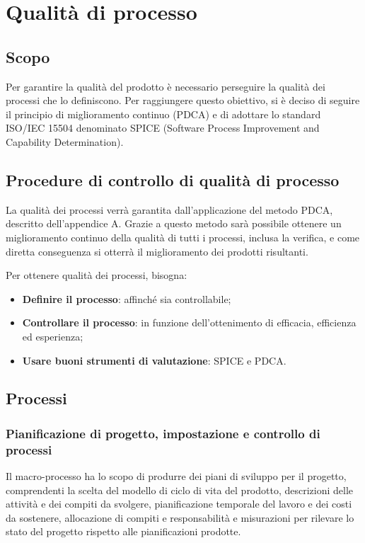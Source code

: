 \documentclass[PianoDiQualifica.tex]{subfiles}
\begin{document}
\chapter{Qualità di processo}

\section{Scopo} 
Per garantire la qualità del prodotto è necessario perseguire la qualità dei processi che lo definiscono.
Per raggiungere questo obiettivo, si è deciso di seguire il principio di miglioramento continuo (PDCA) e di adottare lo standard ISO/IEC 15504 denominato SPICE (Software Process Improvement and Capability Determination).

\section{Procedure di controllo di qualità di processo}
La qualità dei processi verrà garantita dall'applicazione del metodo PDCA, descritto dell'appendice A. Grazie a questo metodo sarà possibile ottenere un miglioramento continuo della qualità di tutti i processi, inclusa la verifica, e come diretta conseguenza si otterrà il miglioramento dei prodotti risultanti. 

Per ottenere qualità dei processi, bisogna:
\begin{itemize}
	\item \textbf{Definire il processo}: affinché sia controllabile;
	\item \textbf{Controllare il processo}: in funzione dell'ottenimento di efficacia, efficienza ed esperienza;
	\item \textbf{Usare buoni strumenti di valutazione}: SPICE e PDCA.
\end{itemize}

\section{Processi}

\subsection{Pianificazione di progetto, impostazione e controllo di processi}
Il macro-processo ha lo scopo di produrre dei piani di sviluppo per il progetto, comprendenti la scelta del modello di ciclo di vita del prodotto, descrizioni delle attività e dei compiti da svolgere, pianificazione temporale del lavoro e dei costi da sostenere, allocazione di compiti e responsabilità e misurazioni per rilevare lo stato del progetto rispetto alle pianificazioni prodotte.
\end{document}
